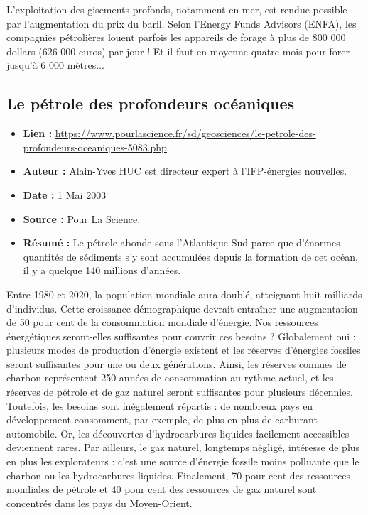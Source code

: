 \documentclass[8pt]{article}
\begin{document}
L'exploitation des gisements profonds, notamment en mer, est rendue possible par l'augmentation du prix du baril. Selon l'Energy Funds Advisors (ENFA), les compagnies pétrolières louent parfois les appareils de forage à plus de 800 000 dollars (626 000 euros) par jour ! Et il faut en moyenne quatre mois pour forer jusqu'à 6 000 mètres...


\newpage
\subsection{Le pétrole des profondeurs océaniques}
\label{sec:atlantique}

\begin{itemize}
	\item \textbf{Lien : }  \url{https://www.pourlascience.fr/sd/geosciences/le-petrole-des-profondeurs-oceaniques-5083.php} 
	\item \textbf{Auteur : } Alain-Yves HUC est directeur expert à l'IFP-énergies nouvelles.
	
	\item \textbf{Date : }  1 Mai 2003
	\item \textbf{Source : } Pour La Science.
	\item \textbf{Résumé : }Le pétrole abonde sous l'Atlantique Sud parce que d'énormes quantités de sédiments s'y sont accumulées depuis la formation de cet océan, il y a quelque 140 millions d'années.
\end{itemize}

Entre 1980 et 2020, la population mondiale aura doublé, atteignant huit milliards d'individus. Cette croissance démographique devrait entraîner une augmentation de 50 pour cent de la consommation mondiale d'énergie. Nos ressources énergétiques seront-elles suffisantes pour couvrir ces besoins ? Globalement oui : plusieurs modes de production d'énergie existent et les réserves d'énergies fossiles seront suffisantes pour une ou deux générations. Ainsi, les réserves connues de charbon représentent 250 années de consommation au rythme actuel, et les réserves de pétrole et de gaz naturel seront suffisantes pour plusieurs décennies. Toutefois, les besoins sont inégalement répartis : de nombreux pays en développement consomment, par exemple, de plus en plus de carburant automobile. Or, les découvertes d'hydrocarbures liquides facilement accessibles deviennent rares. Par ailleurs, le gaz naturel, longtemps négligé, intéresse de plus en plus les explorateurs : c'est une source d'énergie fossile moins polluante que le charbon ou les hydrocarbures liquides. Finalement, 70 pour cent des ressources mondiales de pétrole et 40 pour cent des ressources de gaz naturel sont concentrés dans les pays du Moyen-Orient.\\
\end{document}
